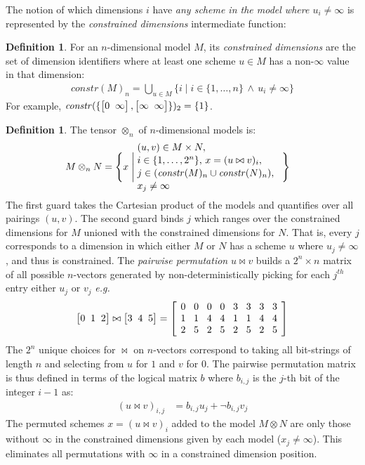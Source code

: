 \documentclass[10pt,preprint]{sigplanconf}
\newcounter{block}
\theoremstyle{definition}
\newtheorem{definition}[block]{Definition}
\newcommand{\eg}{\emph{e.g.}}
\newcommand{\vtwoh}[2]{\setlength{\arraycolsep}{0em}
\left[\begin{array}{cc}#1 \; & \; #2\end{array}\right]}
\newcommand{\vthreeh}[3]{\setlength{\arraycolsep}{0em}
\left[\begin{array}{ccc}#1 \; & \; #2 \; & \; #3\end{array}\right]}
\newcommand{\effdims}[2]{\mathit{constr}(#1)_{#2}}
\begin{document}
The notion of which dimensions $i$ have \emph{any scheme in the model
where $u_i \neq \infty$} is represented by the \emph{constrained
dimensions} intermediate function:
\begin{definition}%
For an $n$-dimensional model $M$, its \emph{constrained dimensions}
are the set of dimension identifiers where at least one scheme $u \in M$ has
a non-$\infty$ value in that dimension:
%
\begin{align*}
\effdims{M}{n} =
\bigcup_{u \in M} \{i \mid i \in \{1,\ldots,n\} \, \wedge \, u_i \neq
  \infty\}
\end{align*}
For example, $\effdims{\{\vtwoh{0}{\infty},\vtwoh{\infty}{\infty}\}}{2}
 = \{1\}$.
\end{definition}
\begin{definition}The tensor $\otimes_n$ of $n$-dimensional
models is:
\begin{alignat*}{2}
& M \otimes_n N =
  \Bigg\{x \; \Bigg| \;
    \parbox{5.2cm}{$(u, v) \in M \times N,$ \\[0.1em]
                  $\;\; i \in \{1, \ldots, 2^n\}, \,
                  x = (u \bowtie v)_i,$ \\[0.1em]
                  $\;\; j \in (\effdims{M}{n} \cup
                   \effdims{N}{n}),$\\[0.1em]
                   $\;\; x_j \neq \infty$
                  } \Bigg\}
\end{alignat*}
The first guard takes the Cartesian product of
the models and quantifies over all pairings $(u, v)$.
The second guard binds $j$ which ranges over the constrained
dimensions for $M$ unioned with the constrained dimensions for $N$.
That is, every $j$ corresponds to a dimension in which
either $M$ or $N$ has a scheme $u$ where $u_j \neq \infty$,
and thus is constrained.
The \emph{pairwise permutation} $u \bowtie v$
builds a $2^n \times n$ matrix
of all possible $n$-vectors generated by
non-deterministically picking for each $j^{th}$ entry either
$u_j$ or $v_j$ \eg{}
%
\begin{equation*}
\vthreeh{0}{1}{2} \bowtie \vthreeh{3}{4}{5} =
\left[
\setlength{\arraycolsep}{0.42em}
\begin{array}{cccccccc}
0 & 0 & 0 & 0 & 3 & 3 & 3 & 3 \\
1 & 1 & 4 & 4 & 1 & 1 & 4 & 4 \\
2 & 5 & 2 & 5 & 2 & 5 & 2 & 5
\end{array}
\right]
\end{equation*}
%
The $2^n$ unique choices for $\bowtie$ on $n$-vectors
correspond to taking all bit-strings of length $n$ and
selecting from $u$ for $1$ and $v$ for $0$. The pairwise permutation
matrix is thus defined in terms of the logical
matrix $b$ where $b_{i,j}$ is the $j$-th bit of the integer
$i - 1$ as:
%
\begin{align*}
(u \bowtie v)_{i,j} & = b_{i,j} u_j + \neg b_{i,j} v_j
\end{align*}
%
The permuted schemes $x = (u \bowtie v)_i$ added to the model
$M \otimes N$ are only those without $\infty$ in
the constrained dimensions given by each model ($x_j \neq
\infty$). This eliminates all permutations with
$\infty$ in a constrained dimension position.
\end{definition}
\end{document}

